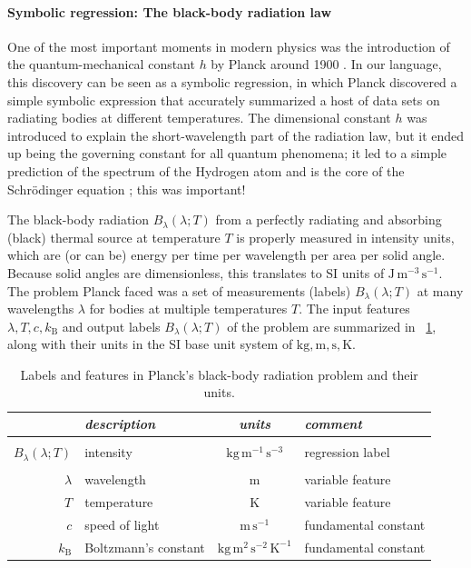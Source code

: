 \documentclass[twoside,11pt]{article}
\newcommand{\tabref}[1]{\tablename~\ref{#1}}
\newcommand{\kB}{k_{\mathrm{B}}}
\newcommand{\unit}[1]{\mathrm{#1}}
\newcommand{\kg}{\unit{kg}}
\newcommand{\m}{\unit{m}}
\newcommand{\s}{\unit{s}}
\newcommand{\K}{\unit{K}}
\newcommand{\J}{\unit{J}}
\begin{document}
\paragraph{Symbolic regression: The black-body radiation law}
One of the most important moments in modern physics was the introduction of the quantum-mechanical constant $h$ by Planck around 1900 \citep{planck}.
In our language, this discovery can be seen as a symbolic regression, in which Planck discovered a simple symbolic expression that accurately summarized a host of data sets on radiating bodies at different temperatures.
The dimensional constant $h$ was introduced to explain the short-wavelength part of the radiation law, but it ended up being the governing constant for all quantum phenomena; it led to a simple prediction of the spectrum of the Hydrogen atom \citep{bohr} and is the core of the Schr\"odinger equation \citep{schrodinger}; this was important!

The black-body radiation $B_\lambda(\lambda;T)$ from a perfectly radiating and absorbing (black) thermal source at temperature $T$ is properly measured in intensity units, which are (or can be) energy per time per wavelength per area per solid angle.
Because solid angles are dimensionless, this translates to SI units of $\J\,\m^{-3}\,\s^{-1}$.
The problem Planck faced was a set of measurements (labels) $B_\lambda(\lambda;T)$ at many wavelengths $\lambda$ for bodies at multiple temperatures $T$.
The input features $\lambda,T,c,\kB$ and output labels $B_\lambda(\lambda;T)$ of the problem are summarized in \tabref{tab:planck}, along with their units in the SI base unit system of $\kg,\m,\s,\K$.

\begin{table}[t]
    \centering
    \begin{tabular}{r|l|c|l}
    & \emph{description} & \emph{units} & \emph{comment} \\ \hline
    & & & \\[-1ex]
    $B_\lambda(\lambda;T)$ & intensity & $\kg\,\m^{-1}\,\s^{-3}$ & regression label \\
    & & & \\[-1ex]
    $\lambda$ & wavelength & $\m$ & variable feature\\
    $T$ & temperature & $\K$ & variable feature\\
    $c$ & speed of light & $\m\,\s^{-1}$ & fundamental constant\\
    $\kB$ & Boltzmann's constant & $\kg\,\m^{2}\,\s^{-2}\,\K^{-1}$ & fundamental constant\\
    \end{tabular}
    \caption{Labels and features in Planck's black-body radiation problem and their units.}
    \label{tab:planck}
\end{table}
\end{document}
